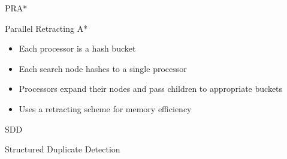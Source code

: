 \documentclass[style=unh]{powerdot}
\begin{document}

\begin{slide}{PRA*}
  \vspace{.2in}
  \begin{center}
    Parallel Retracting A*
  \end{center}

  \vspace{.1in}

  \begin{itemize}[type=1]
  \item Each processor is a hash bucket
  \item Each search node hashes to a single processor
  \item Processors expand their nodes and pass children to
    appropriate buckets
  \item Uses a retracting scheme for memory efficiency
  \end{itemize}
\end{slide}


\begin{slide}{SDD}
  \vspace{.2in}
  \begin{center}
    Structured Duplicate Detection
  \end{center}

\end{slide}
\end{document}
